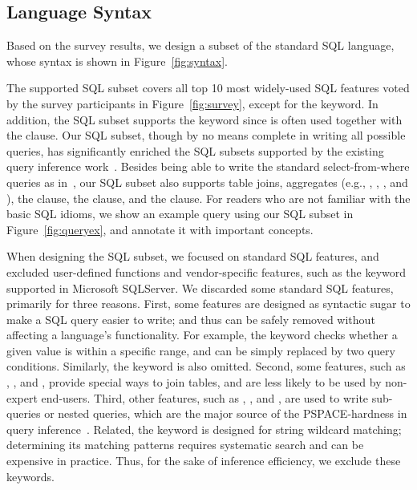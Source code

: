\subsection{Language Syntax}
\label{sec:syntax}

Based on the survey results, we design a subset
of the standard SQL language, whose
syntax is shown in Figure~\ref{fig:syntax}.


The supported SQL subset covers all top 10 most widely-used SQL
features voted by the survey participants
in Figure~\ref{fig:survey}, except for the  keyword.
In addition, the SQL subset supports the 
keyword since  is often used together with the  clause.
Our SQL subset, though by no means complete in writing all
possible queries, has significantly
enriched the SQL subsets supported by the existing query inference
work~\cite{DasSarma:2010, Tran:2009}. Besides being able to write the
standard select-from-where queries as in~\cite{DasSarma:2010, Tran:2009},
our SQL subset also supports table joins, aggregates
(e.g., , , , and ),
the  clause, the  clause,
and the  clause. For readers who are not
familiar with the basic SQL idioms, we show an example query
using our SQL subset in Figure~\ref{fig:queryex}, and annotate
it with important concepts.


When designing the SQL subset, we focused on standard
SQL features, and excluded user-defined functions and
vendor-specific features, such as the 
keyword supported in Microsoft SQLServer. 
We discarded some standard SQL features, primarily for
three reasons. First, some features are designed
as syntactic sugar to make a SQL query easier to write;
and thus can be safely removed without affecting a language's
functionality. For example, the 
keyword checks whether a given value is within a specific
range, and can be simply replaced by two query conditions.
Similarly, the  keyword is also omitted.
Second, some features, such as 
, , and ,
provide special ways to join tables, and are less likely to be
used by non-expert end-users.
Third, other features, such as , , and ,
are used to write sub-queries or nested queries, which are the major source
of the PSPACE-hardness in query inference~\cite{DasSarma:2010}.
Related, the  keyword is designed for string
wildcard matching; determining its matching
patterns requires systematic search and can be
expensive in practice. Thus, 
for the sake of inference efficiency, we exclude these keywords.


